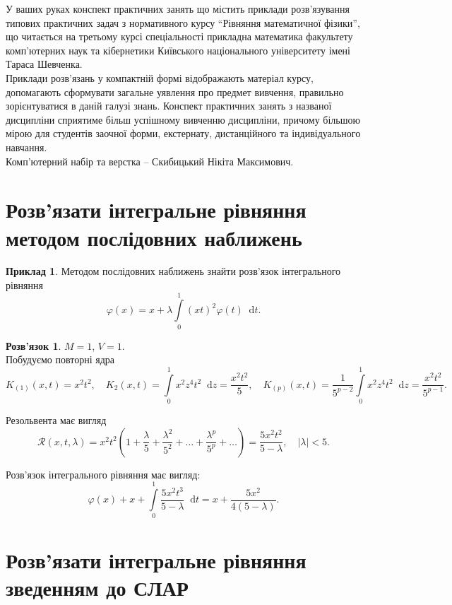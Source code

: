 \documentclass[a4paper, 12pt]{article}
\theoremstyle{definition}
\newtheorem*{example*}{Приклад}
\newtheorem*{solution*}{Розв'язок}
\newcommand{\Int}{\displaystyle\int\limits}
\newcommand*\diff{\mathop{}\!\mathrm{d}}
\renewcommand{\phi}{\varphi}
\begin{document}
У ваших руках конспект практичних занять що містить приклади розв'язування типових практичних задач з нормативного курсу ``Рівняння математичної фізики'', що читається на третьому курсі спеціальності прикладна математика факультету комп'ютерних наук та кібернетики Київського національного університету імені Тараса Шевченка. \\

Приклади розв'язань у компактній формі відображають матеріал курсу, допомагають сформувати загальне уявлення про предмет вивчення, правильно зорієнтуватися в даній галузі знань. Конспект практичних занять з названої дисципліни сприятиме більш успішному вивченню дисципліни, причому більшою мірою для студентів заочної форми, екстернату, дистанційного та індивідуального навчання. \\

Комп'ютерний набір та верстка -- Скибицький Нікіта Максимович.

\tableofcontents \newpage

\section{Розв'язати інтегральне рівняння методом послідовних наближень}
\begin{example*}
	Методом послідовних наближень знайти розв’язок інтегрального рівняння \[\phi(x) = x + \lambda \Int_0^1 (xt)^2 \phi(t) \diff t.\]
\end{example*}

\begin{solution*}
	$M = 1$, $V = 1$. \\

	Побудуємо повторні ядра \[ K_{(1)}(x, t) = x^2t^2, \quad K_2(x, t) = \Int_0^1 x^2 z^4 t^2 \diff z = \dfrac{x^2t^2}{5}, \quad K_{(p)}(x, t) = \dfrac{1}{5^{p - 2}} \Int_0^1 x^2 z^4 t^2 \diff z = \dfrac{x^2t^2}{5^{p - 1}}. \]
	
	Резольвента має вигляд \[\mathcal{R}(x, t, \lambda) = x^2 t^2 \left(1 + \dfrac{\lambda}{5} + \dfrac{\lambda^2}{5^2} + \ldots + \dfrac{\lambda^p}{5^p} + \ldots \right) = \dfrac{5x^2t^2}{5 - \lambda}, \quad |\lambda| < 5. \]

	Розв’язок інтегрального рівняння має вигляд: \[ \phi(x) + x + \Int_0^1 \dfrac{5x^2t^3}{5 - \lambda} \diff t = x + \dfrac{5x^2}{4(5 - \lambda)}. \]
\end{solution*}

\newpage

\section{Розв'язати інтегральне рівняння зведенням до СЛАР}
\end{document}
